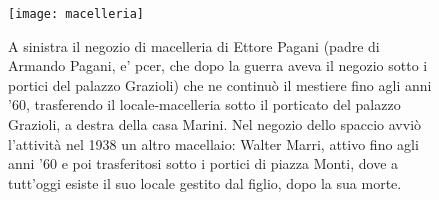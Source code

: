  \begin{figure}[htb]
    \centering
    \texttt{[image: macelleria]}
    \caption*{A sinistra il negozio di macelleria di Ettore Pagani (padre di Armando Pagani, e' pcer, che dopo la guerra aveva il negozio sotto i portici del palazzo Grazioli) che ne continuò il mestiere fino agli anni '60, trasferendo il locale-macelleria sotto il porticato del palazzo Grazioli, a destra della casa Marini. Nel negozio dello spaccio avviò l'attività nel 1938 un altro macellaio: Walter Marri, attivo fino agli anni '60 e poi trasferitosi sotto i portici di piazza Monti, dove a tutt'oggi esiste il suo locale gestito dal figlio, dopo la sua morte.\label{fig:macelleria}}
\end{figure}











































%
